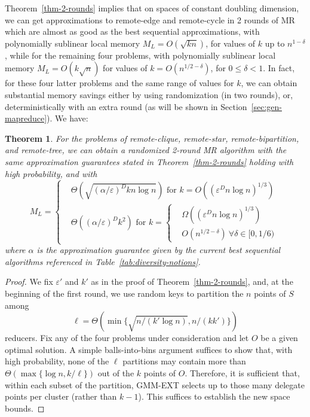 \documentclass{article}
\newtheorem{theorem}{Theorem}
\renewcommand{\epsilon}{\varepsilon}
\newcommand{\BO}[1]{O\left( #1 \right)}
\newcommand{\BT}[1]{\Theta\left( #1 \right)}
\newcommand{\BOM}[1]{\Omega\left( #1 \right)}
\begin{document}
Theorem~\ref{thm-2-rounds} implies that on spaces of constant doubling
dimension, we can get approximations to remote-edge and remote-cycle
in 2 rounds of MR which are almost as good as the best sequential
approximations, with polynomially sublinear local memory
$M_L=\BO{\sqrt{kn}}$, for values of $k$ up to $n^{1-{\delta}}$, while
for the remaining four problems, with polynomially sublinear local
memory $M_L=\BO{k\sqrt{n}}$ for values of $k = \BO{n^{1/2-{\delta}}}$,
for $0\le {\delta} <1$. In fact, for these four latter problems and the
same range of values for $k$, we can obtain substantial memory savings
either by using randomization (in two rounds), or, deterministically
with an extra round (as will be shown in
Section~\ref{sec:gen-mapreduce}). We have:
\begin{theorem}\label{thm-2-rounds-rand}
  For the problems of remote-clique, remote-star, remote-bipartition,
  and remote-tree, we can obtain a randomized 2-round MR algorithm
  with the same approximation guarantees stated in
  Theorem~\ref{thm-2-rounds} holding with high probability, and with
\[
    M_L = \left\{
      \begin{aligned}
        &\BT{\sqrt{(\alpha/\epsilon)^Dkn\log n}} \text{ for } k = \BO{(\epsilon^Dn\log n)^{1/3}} \\
        &\BT{({\alpha/\epsilon})^Dk^2} \text{ for }
        k = \left\{
          \begin{aligned}
            &\BOM{(\epsilon^Dn\log n)^{1/3}}\\
            &\BO{n^{1/2-{\delta}}} ~\forall {\delta}\in[0, 1/6)
          \end{aligned}
        \right.
      \end{aligned}
    \right.
  \] 
where $\alpha$ is the approximation guarantee given by the current
best sequential algorithms referenced in
Table~\ref{tab:diversity-notions}.
\end{theorem}
\begin{proof}
  We fix $\epsilon'$ and $k'$ as in the proof of
  Theorem~\ref{thm-2-rounds}, and, at the beginning of the first
  round, we use random keys to partition the $n$ points of $S$ among
  \[
    \ell = \BT{\min\{ \sqrt{n/(k'\log n)} , n/(kk') \}}
  \]
  reducers. Fix
  any of the four problems under consideration and let $O$ be a given
  optimal solution. A simple balls-into-bins argument suffices to show
  that, with high probability, none of the $\ell$ partitions may
  contain more than $\BT{ \max\{\log n, k/\ell\}}$ out of the $k$
  points of $O$.  Therefore, it is sufficient that, within each subset
  of the partition, {\sc GMM-EXT} selects up to those many delegate
  points per cluster (rather than $k-1$).  This suffices to establish
  the new space bounds.
\end{proof}
\end{document}
